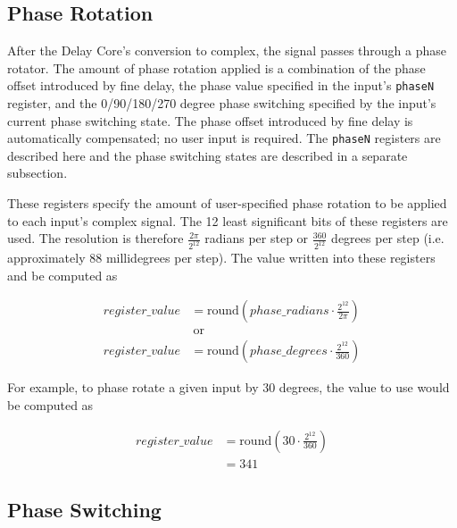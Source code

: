 \documentclass[12pt]{article}
\begin{document}
  \subsection{Phase Rotation}

After the Delay Core's conversion to complex, the signal passes through a phase
rotator.  The amount of phase rotation applied is a combination of the phase
offset introduced by fine delay, the phase value specified in the input's
\verb|phaseN| register, and the 0/90/180/270 degree phase switching specified
by the input's current phase switching state.  The phase offset introduced by
fine delay is automatically compensated; no user input is required.  The
\verb|phaseN| registers are described here and the phase switching states are
described in a separate subsection.

\begin{description}

\filbreak
{}
 These registers specify the amount of user-specified phase
rotation to be applied to each input's complex signal.  The 12 least
significant bits of these registers are used.  The resolution is therefore
$\frac{2 \pi}{2^{12}}$ radians per step or $\frac{360}{2^{12}}$ degrees per
step (i.e. approximately 88 millidegrees per step).  The value written into
these registers and be computed as

\begin{align*}
register\_value &=  \mathrm{round}\left(
                      phase\_radians \cdot \frac{2^{12}}{2 \pi}
                    \right) \\
                &   \:\text{or} \\
register\_value &=  \mathrm{round}\left(
                      phase\_degrees \cdot \frac{2^{12}}{360}
                    \right)
\end{align*}

For example, to phase
rotate a given input by 30 degrees, the value to use would be computed as

\begin{align*}
register\_value &=  \mathrm{round}\left(30 \cdot \frac{2^{12}}{360}\right) \\
                &=  341
\end{align*}

\end{description}

  \subsection{Phase Switching}
\end{document}
